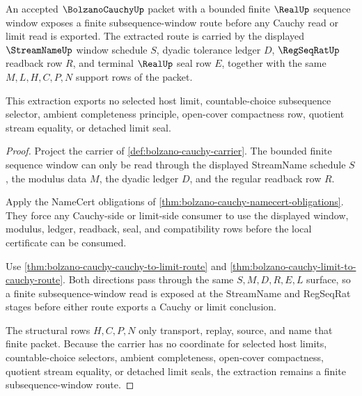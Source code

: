 \begin{theorem}
\label{thm:bolzano-cauchy-subsequence-window-extraction}
An accepted $\BolzanoCauchyUp$ packet with a bounded finite $\RealUp$ sequence window exposes a finite subsequence-window route before any Cauchy read or limit read is exported. The extracted route is carried by the displayed $\StreamNameUp$ window schedule $S$, dyadic tolerance ledger $D$, $\RegSeqRatUp$ readback row $R$, and terminal $\RealUp$ seal row $E$, together with the same $M,L,H,C,P,N$ support rows of the packet.

This extraction exports no selected host limit, countable-choice subsequence selector, ambient completeness principle, open-cover compactness row, quotient stream equality, or detached limit seal.
\end{theorem}
\begin{proof}
Project the carrier of \autoref{def:bolzano-cauchy-carrier}. The bounded finite sequence window can only be read through the displayed StreamName schedule $S$, the modulus data $M$, the dyadic ledger $D$, and the regular readback row $R$.

Apply the NameCert obligations of \autoref{thm:bolzano-cauchy-namecert-obligations}. They force any Cauchy-side or limit-side consumer to use the displayed window, modulus, ledger, readback, seal, and compatibility rows before the local certificate can be consumed.

Use \autoref{thm:bolzano-cauchy-cauchy-to-limit-route} and \autoref{thm:bolzano-cauchy-limit-to-cauchy-route}. Both directions pass through the same $S,M,D,R,E,L$ surface, so a finite subsequence-window read is exposed at the StreamName and RegSeqRat stages before either route exports a Cauchy or limit conclusion.

The structural rows $H,C,P,N$ only transport, replay, source, and name that finite packet. Because the carrier has no coordinate for selected host limits, countable-choice selectors, ambient completeness, open-cover compactness, quotient stream equality, or detached limit seals, the extraction remains a finite subsequence-window route.
\end{proof}

